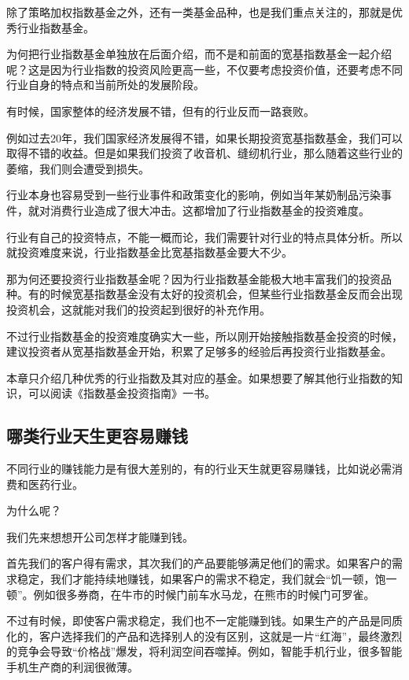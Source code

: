 

除了策略加权指数基金之外，还有一类基金品种，也是我们重点关注的，那就是优秀行业指数基金。

为何把行业指数基金单独放在后面介绍，而不是和前面的宽基指数基金一起介绍呢？这是因为行业指数的投资风险更高一些，不仅要考虑投资价值，还要考虑不同行业自身的特点和当前所处的发展阶段。

有时候，国家整体的经济发展不错，但有的行业反而一路衰败。

例如过去20年，我们国家经济发展得不错，如果长期投资宽基指数基金，我们可以取得不错的收益。但是如果我们投资了收音机、缝纫机行业，那么随着这些行业的萎缩，我们则会遭受到损失。

行业本身也容易受到一些行业事件和政策变化的影响，例如当年某奶制品污染事件，就对消费行业造成了很大冲击。这都增加了行业指数基金的投资难度。

行业有自己的投资特点，不能一概而论，我们需要针对行业的特点具体分析。所以就投资难度来说，行业指数基金比宽基指数基金要大不少。

那为何还要投资行业指数基金呢？因为行业指数基金能极大地丰富我们的投资品种。有的时候宽基指数基金没有太好的投资机会，但某些行业指数基金反而会出现投资机会，这就能对我们的投资起到很好的补充作用。

不过行业指数基金的投资难度确实大一些，所以刚开始接触指数基金投资的时候，建议投资者从宽基指数基金开始，积累了足够多的经验后再投资行业指数基金。

本章只介绍几种优秀的行业指数及其对应的基金。如果想要了解其他行业指数的知识，可以阅读《指数基金投资指南》一书。

\subsection{哪类行业天生更容易赚钱}
不同行业的赚钱能力是有很大差别的，有的行业天生就更容易赚钱，比如说必需消费和医药行业。

为什么呢？

我们先来想想开公司怎样才能赚到钱。

首先我们的客户得有需求，其次我们的产品要能够满足他们的需求。如果客户的需求稳定，我们才能持续地赚钱，如果客户的需求不稳定，我们就会“饥一顿，饱一顿”。例如很多券商，在牛市的时候门前车水马龙，在熊市的时候门可罗雀。

不过有时候，即使客户需求稳定，我们也不一定能赚到钱。如果生产的产品是同质化的，客户选择我们的产品和选择别人的没有区别，这就是一片“红海”，最终激烈的竞争会导致“价格战”爆发，将利润空间吞噬掉。例如，智能手机行业，很多智能手机生产商的利润很微薄。

